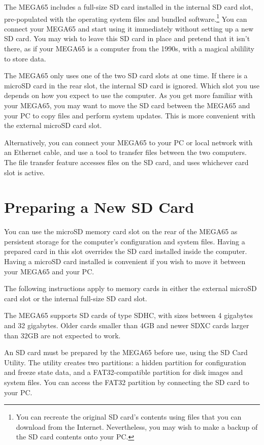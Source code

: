 The MEGA65 includes a full-size SD card installed in the internal SD card slot, pre-populated with the operating system files and bundled software.\footnote{You can recreate the original SD card's contents using files that you can download from the Internet. Nevertheless, you may wish to make a backup of the SD card contents onto your PC.} You can connect your MEGA65 and start using it immediately without setting up a new SD card. You may wish to leave this SD card in place and pretend that it isn't there, as if your MEGA65 is a computer from the 1990s, with a magical abilility to store data.

The MEGA65 only uses one of the two SD card slots at one time. If there is a microSD card in the rear slot, the internal SD card is ignored. Which slot you use depends on how you expect to use the computer. As you get more familiar with your MEGA65, you may want to move the SD card between the MEGA65 and your PC to copy files and perform system updates. This is more convenient with the external microSD card slot.

Alternatively, you can connect your MEGA65 to your PC or local network with an Ethernet cable, and use a tool to transfer files between the two computers. The file transfer feature accesses files on the SD card, and uses whichever card slot is active.

\section{Preparing a New SD Card}

You can use the microSD memory card slot on the rear of the MEGA65 as persistent storage for the computer's configuration and system files. Having a prepared card in this slot overrides the SD card installed inside the computer. Having a microSD card installed is convenient if you wish to move it between your MEGA65 and your PC.

The following instructions apply to memory cards in either the external microSD card slot or the internal full-size SD card slot.

The MEGA65 supports SD cards of type SDHC, with sizes between 4 gigabytes and 32 gigabytes. Older cards smaller than 4GB and newer SDXC cards larger than 32GB are not expected to work.

An SD card must be prepared by the MEGA65 before use, using the SD Card Utility. The utility creates two partitions: a hidden partition for configuration and freeze state data, and a FAT32-compatible partition for disk images and system files. You can access the FAT32 partition by connecting the SD card to your PC.

